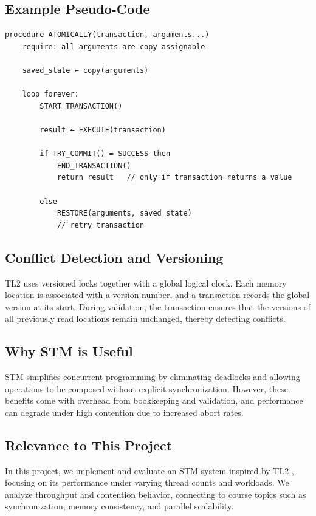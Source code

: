 \documentclass[11pt,a4paper]{article}
\begin{document}
\subsection{Example Pseudo-Code}

\begin{verbatim}
procedure ATOMICALLY(transaction, arguments...)
    require: all arguments are copy-assignable

    saved_state ← copy(arguments)

    loop forever:
        START_TRANSACTION()

        result ← EXECUTE(transaction)

        if TRY_COMMIT() = SUCCESS then
            END_TRANSACTION()
            return result   // only if transaction returns a value

        else
            RESTORE(arguments, saved_state)
            // retry transaction
\end{verbatim}

\subsection{Conflict Detection and Versioning}

TL2 \cite{tl2} uses versioned locks together with a global logical clock. Each memory location is associated with a version number, and a transaction records the global version at its start. During validation, the transaction ensures that the versions of all previously read locations remain unchanged, thereby detecting conflicts.

\subsection{Why STM is Useful}

STM simplifies concurrent programming by eliminating deadlocks and allowing operations to be composed without explicit synchronization. However, these benefits come with overhead from bookkeeping and validation, and performance can degrade under high contention due to increased abort rates.
\subsection{Relevance to This Project}

In this project, we implement and evaluate an STM system inspired by TL2 \cite{tl2}, focusing on its performance under varying thread counts and workloads. We analyze throughput and contention behavior, connecting to course topics such as synchronization, memory consistency, and parallel scalability.
\end{document}
